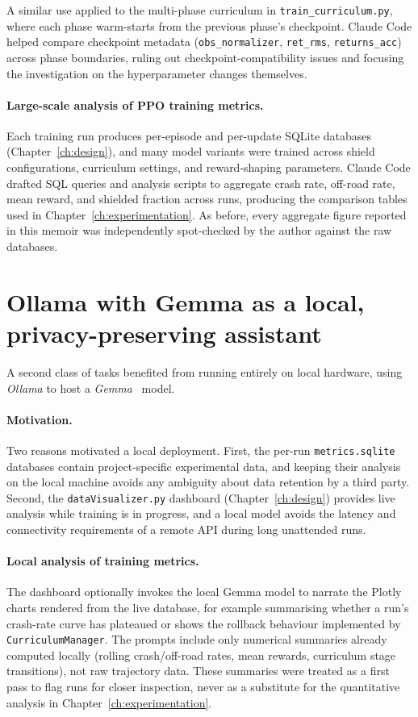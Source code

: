 A similar use applied to the multi-phase curriculum in \texttt{train\_curriculum.py},
where each phase warm-starts from the previous phase's checkpoint. Claude Code helped
compare checkpoint metadata (\texttt{obs\_normalizer}, \texttt{ret\_rms},
\texttt{returns\_acc}) across phase boundaries, ruling out checkpoint-compatibility
issues and focusing the investigation on the hyperparameter changes themselves.

\paragraph{Large-scale analysis of PPO training metrics.}
Each training run produces per-episode and per-update SQLite databases
(Chapter~\ref{ch:design}), and many model variants were trained across shield
configurations, curriculum settings, and reward-shaping parameters. Claude Code drafted
SQL queries and analysis scripts to aggregate crash rate, off-road rate, mean reward,
and shielded fraction across runs, producing the comparison tables used in
Chapter~\ref{ch:experimentation}. As before, every aggregate figure reported in this
memoir was independently spot-checked by the author against the raw databases.

\section{Ollama with Gemma as a local, privacy-preserving assistant}\label{app:ai-ollama}

A second class of tasks benefited from running entirely on local hardware, using
\textit{Ollama} to host a \textit{Gemma}~\cite{team2024gemma} model.

\paragraph{Motivation.}
Two reasons motivated a local deployment. First, the per-run \texttt{metrics.sqlite}
databases contain project-specific experimental data, and keeping their analysis on the
local machine avoids any ambiguity about data retention by a third party. Second, the
\texttt{dataVisualizer.py} dashboard (Chapter~\ref{ch:design}) provides live
analysis while training is in progress, and a local model avoids the latency and
connectivity requirements of a remote API during long unattended runs.

\paragraph{Local analysis of training metrics.}
The dashboard optionally invokes the local Gemma model to narrate the Plotly charts
rendered from the live database, for example summarising whether a run's crash-rate
curve has plateaued or shows the rollback behaviour implemented by
\texttt{CurriculumManager}. The prompts include only numerical summaries already
computed locally (rolling crash/off-road rates, mean rewards, curriculum stage
transitions), not raw trajectory data. These summaries were treated as a first pass to
flag runs for closer inspection, never as a substitute for the quantitative analysis in
Chapter~\ref{ch:experimentation}.


